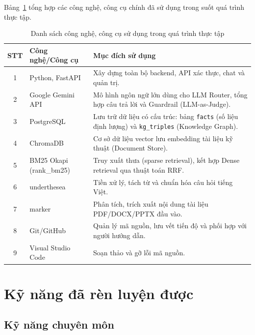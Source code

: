 Bảng~\ref{tab:cong-nghe-su-dung} tổng hợp các công nghệ, công cụ chính đã sử dụng trong
suốt quá trình thực tập.

\begin{table}[H]
\centering
\caption{Danh sách công nghệ, công cụ sử dụng trong quá trình thực tập}
\label{tab:cong-nghe-su-dung}
\begin{tabular}{|c|p{4cm}|p{8cm}|}
\hline
\textbf{STT} & \textbf{Công nghệ/Công cụ} & \textbf{Mục đích sử dụng} \\
\hline
1 & Python, FastAPI & Xây dựng toàn bộ backend, API xác thực, chat và quản trị. \\
\hline
2 & Google Gemini API & Mô hình ngôn ngữ lớn dùng cho LLM Router, tổng hợp câu trả lời
và Guardrail (LLM-as-Judge). \\
\hline
3 & PostgreSQL & Lưu trữ dữ liệu có cấu trúc: bảng \texttt{facts} (số liệu định lượng)
và \texttt{kg\_triples} (Knowledge Graph). \\
\hline
4 & ChromaDB & Cơ sở dữ liệu vector lưu embedding tài liệu kỹ thuật (Document Store). \\
\hline
5 & BM25 Okapi (rank\_bm25) & Truy xuất thưa (sparse retrieval), kết hợp Dense retrieval
qua thuật toán RRF. \\
\hline
6 & underthesea & Tiền xử lý, tách từ và chuẩn hóa câu hỏi tiếng Việt. \\
\hline
7 & marker & Phân tích, trích xuất nội dung tài liệu PDF/DOCX/PPTX đầu vào. \\
\hline
8 & Git/GitHub & Quản lý mã nguồn, lưu vết tiến độ và phối hợp với người hướng dẫn. \\
\hline
9 & Visual Studio Code & Soạn thảo và gỡ lỗi mã nguồn. \\
\hline
\end{tabular}
\end{table}

\section{Kỹ năng đã rèn luyện được}

\subsection{Kỹ năng chuyên môn}

